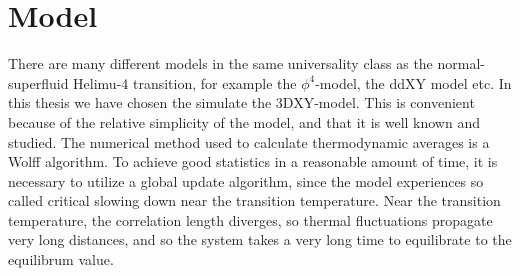 %

\section{Model}
There are many different models in the same universality class as the normal-superfluid Helimu-4 transition, for example the $\phi^4$-model, the ddXY model etc.
In this thesis we have chosen the simulate the 3DXY-model. This is convenient because of the relative simplicity of the model, and that it is well known and studied.
The numerical method used to calculate thermodynamic averages is a Wolff algorithm.
To achieve good statistics in a reasonable amount of time, it is necessary to utilize a global update algorithm, since the model experiences so called critical slowing down near the transition temperature. 
Near the transition temperature, the correlation length diverges, so thermal fluctuations propagate very long distances, and so the system takes a very long time to equilibrate to the equilibrum value.

